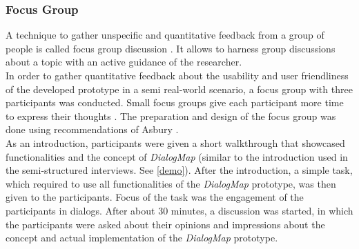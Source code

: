 \subsubsection{Focus Group}
A technique to gather unspecific and quantitative feedback from a group of people is called focus group discussion \cite{morgan1996_focus_groups}. It allows to harness group discussions about a topic with an active guidance of the researcher.\\
In order to gather quantitative feedback about the usability and user friendliness of the developed prototype in a semi real-world scenario, a focus group with three participants was conducted. Small focus groups give each participant more time to express their thoughts \cite{morgan1996_focus_groups}. The preparation and design of the focus group was done using recommendations of Asbury \cite{asbury1995overview}.\\
As an introduction, participants were given a short walkthrough that showcased functionalities and the concept of \textit{DialogMap} (similar to the introduction used in the semi-structured interviews. See \ref{demo}). After the introduction, a simple task, which required to use all functionalities of the \textit{DialogMap} prototype, was then given to the participants. Focus of the task was the engagement of the participants in dialogs. After about 30 minutes, a discussion was started, in which the participants were asked about their opinions and impressions about the concept and actual implementation of the \textit{DialogMap} prototype.
